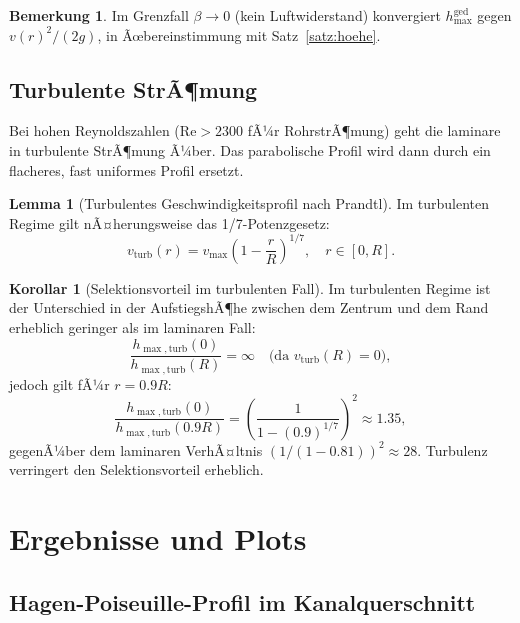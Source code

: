 ﻿\documentclass[a4paper,12pt]{article}
\theoremstyle{definition}
\newtheorem{lemma}{Lemma}
\newtheorem{bemerkung}{Bemerkung}
\newtheorem{korollar}{Korollar}
\begin{document}
\begin{bemerkung}
    Im Grenzfall $\beta \to 0$ (kein Luftwiderstand) konvergiert $h_{\max}^{\text{ged}}$
    gegen $v(r)^2/(2g)$, in Ãœbereinstimmung mit Satz~\ref{satz:hoehe}.
\end{bemerkung}

\subsection{Turbulente StrÃ¶mung}

Bei hohen Reynoldszahlen ($\mathrm{Re} > 2300$ fÃ¼r RohrstrÃ¶mung) geht die laminare
in turbulente StrÃ¶mung Ã¼ber. Das parabolische Profil wird dann durch ein flacheres,
fast uniformes Profil ersetzt.

\begin{lemma}[Turbulentes Geschwindigkeitsprofil nach Prandtl]
    Im turbulenten Regime gilt nÃ¤herungsweise das 1/7-Potenzgesetz:
    \[
    v_{\text{turb}}(r) = v_{\max}\left(1 - \frac{r}{R}\right)^{1/7}, \quad r \in [0, R].
    \]
\end{lemma}

\begin{korollar}[Selektionsvorteil im turbulenten Fall]
    Im turbulenten Regime ist der Unterschied in der AufstiegshÃ¶he zwischen dem Zentrum
    und dem Rand erheblich geringer als im laminaren Fall:
    \[
    \frac{h_{\max,\text{turb}}(0)}{h_{\max,\text{turb}}(R)} = \infty
    \quad \text{(da $v_{\text{turb}}(R) = 0$)},
    \]
    jedoch gilt fÃ¼r $r = 0.9R$:
    \[
    \frac{h_{\max,\text{turb}}(0)}{h_{\max,\text{turb}}(0.9R)}
    = \left(\frac{1}{1-(0.9)^{1/7}}\right)^2 \approx 1.35,
    \]
    gegenÃ¼ber dem laminaren VerhÃ¤ltnis $(1/(1-0.81))^2 \approx 28$.
    Turbulenz verringert den Selektionsvorteil erheblich.
\end{korollar}

\section{Ergebnisse und Plots}

\subsection{Hagen-Poiseuille-Profil im Kanalquerschnitt}
\end{document}

